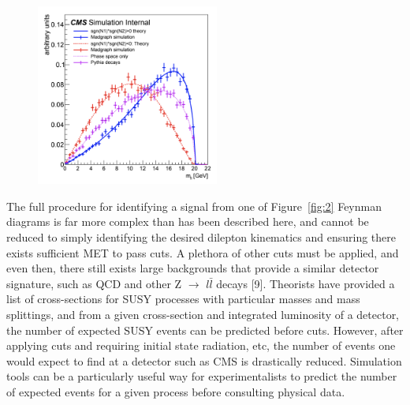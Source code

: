\documentclass{article}
\begin{document}
\begin{figure}[H]
    \centering
    \caption{} 
    \includegraphics[width=6cm]{Dilepton.png}
    \label{fig:4}
\end{figure}
\par
The full procedure for identifying a signal from one of Figure~\ref{fig:2} Feynman diagrams is far more complex than has been described here, and cannot be reduced to simply identifying the desired dilepton kinematics and ensuring there exists sufficient MET to pass cuts. A plethora of other cuts must be applied, and even then, there still exists large backgrounds that provide a similar detector signature, such as QCD and other Z $\rightarrow$ $l\bar{l}$ decays [9]. Theorists have provided a list of cross-sections for SUSY processes with particular masses and mass splittings, and from a given cross-section and integrated luminosity of a detector, the number of expected SUSY events can be predicted before cuts. However, after applying cuts and requiring initial state radiation, etc, the number of events one would expect to find at a detector such as CMS is drastically reduced. Simulation tools can be a particularly useful way for experimentalists to predict the number of expected events for a given process before consulting physical data.
\end{document}
